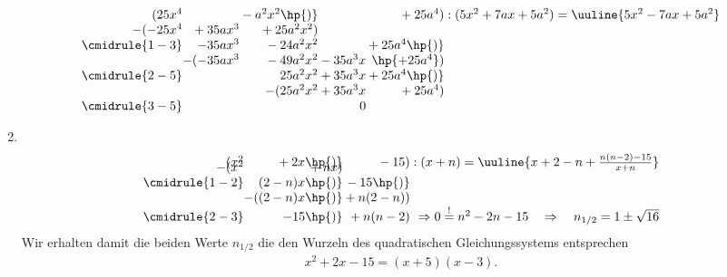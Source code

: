 \begin{enumerate}[label=(\alph*), labelindent=1em,labelsep=0.5cm]
    \begin{align*}
        \begin{array}{r@{} r@{} r@{} r@{} r@{} r}
            (25x^4 &{}&{}-a^2x^2\hp{)}&{}&{}+25a^4) &\;:(5x^2 
            + 7ax +5a^2) = \uuline{5x^2 -7ax +5a^2} \\
          -(-25x^4 &{}+35ax^3&{}+25a^2x^2) \\ 
          \cmidrule{1-3}
                & -35ax^3 &{} -24a^2x^2 &{}&{}+25a^4\hp{)}\\
                &-(-35ax^3&{} -49a^2x^2&{}-35a^3 x&{}\hp{+25a^4}) \\
          \cmidrule{2-5}
                & &{}25a^2 x^2&{}+35a^3x&{}+{25a^4}\hp{)}\\
                & &-(25a^2 x^2&{}+35a^3x&{}+{25a^4})\\
          \cmidrule{3-5} 
                & & & 0
        \end{array}
    \end{align*}
    \item$~$\\[-1.3cm]
    \begin{align*}
        \begin{array}{r@{} r@{} r@{} r}
            (x^2 &{} +2x \hp{)}&{}-15) &\;:(x+n) = \uuline{x+2-n + \frac{n(n-2)-15}{x+n}} \\[-3mm]
          -(x^2 &{}+nx) \\ 
          \cmidrule{1-2}
                & (2-n)x \hp{)}&{} -15\hp{)}\\
                &-((2-n)x\hp{)}&{} +n(2-n)) \\
          \cmidrule{2-3}
                & -15\hp{)}&{}+n(n-2) & \Rightarrow 0 \overset{!}{=} n^2 - 2n -15 \quad \Rightarrow \quad n_{1/2} = 1 \pm \sqrt{16}
        \end{array}
    \end{align*}
    Wir erhalten damit die beiden Werte $n_{1/2}$ die den Wurzeln des quadratischen Gleichungssystems entsprechen 
    \begin{align*}
        x^2 + 2x -15 = (x+5)(x-3).
    \end{align*}
\end{enumerate}

\newpage
